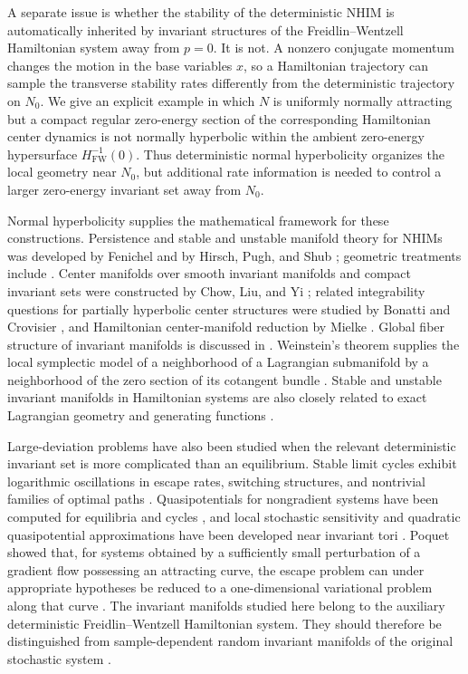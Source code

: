 \documentclass[11pt]{article}
\theoremstyle{definition}
\theoremstyle{remark}
\begin{document}
A separate issue is whether the stability of the deterministic NHIM is automatically inherited by invariant structures of the Freidlin--Wentzell Hamiltonian system away from $p=0$.  It is not.  A nonzero conjugate momentum changes the motion in the base variables $x$, so a Hamiltonian trajectory can sample the transverse stability rates differently from the deterministic trajectory on $N_0$.  We give an explicit example in which $N$ is uniformly normally attracting but a compact regular zero-energy section of the corresponding Hamiltonian center dynamics is not normally hyperbolic within the ambient zero-energy hypersurface $H_{\mathrm{FW}}^{-1}(0)$.  Thus deterministic normal hyperbolicity organizes the local geometry near $N_0$, but additional rate information is needed to control a larger zero-energy invariant set away from $N_0$.

Normal hyperbolicity supplies the mathematical framework for these constructions.  Persistence and stable and unstable manifold theory for NHIMs was developed by Fenichel and by Hirsch, Pugh, and Shub \cite{Fenichel1971,Fenichel1974,HirschPughShub1977}; geometric treatments include \cite{Wiggins1994,Eldering2013}.  Center manifolds over smooth invariant manifolds and compact invariant sets were constructed by Chow, Liu, and Yi \cite{ChowLiuYi2000Smooth,ChowLiuYi2000Sets}; related integrability questions for partially hyperbolic center structures were studied by Bonatti and Crovisier \cite{BonattiCrovisier2016}, and Hamiltonian center-manifold reduction by Mielke \cite{Mielke1991}.  Global fiber structure of invariant manifolds is discussed in \cite{ElderingKvalheimRevzen2018}.  Weinstein's theorem supplies the local symplectic model of a neighborhood of a Lagrangian submanifold by a neighborhood of the zero section of its cotangent bundle \cite{Weinstein1971}.  Stable and unstable invariant manifolds in Hamiltonian systems are also closely related to exact Lagrangian geometry and generating functions \cite{RudnevWiggins1999}.

Large-deviation problems have also been studied when the relevant deterministic invariant set is more complicated than an equilibrium.  Stable limit cycles exhibit logarithmic oscillations in escape rates, switching structures, and nontrivial families of optimal paths \cite{MaierStein1996PRL,SmelyanskiyDykmanMaier1997}.  Quasipotentials for nongradient systems have been computed for equilibria and cycles \cite{Cameron2012}, and local stochastic sensitivity and quadratic quasipotential approximations have been developed near invariant tori \cite{BashkirtsevaRyashko2016}.  Poquet showed that, for systems obtained by a sufficiently small perturbation of a gradient flow possessing an attracting curve, the escape problem can under appropriate hypotheses be reduced to a one-dimensional variational problem along that curve \cite{Poquet2014}.  The invariant manifolds studied here belong to the auxiliary deterministic Freidlin--Wentzell Hamiltonian system.  They should therefore be distinguished from sample-dependent random invariant manifolds of the original stochastic system \cite{Arnold1998,Boxler1989}.
\end{document}
